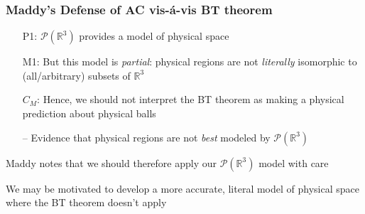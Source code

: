 \begin{frame}
\frametitle{Maddy's Defense of AC vis-\'a-vis BT theorem}

\begin{itemize}[<+->]


\item[P1:] $\mathcal{P}(\mathbb{R}^3)$ provides a model of physical space

\item[M1:] But this model is \textit{partial}: physical regions are not \textit{literally} isomorphic to (all/arbitrary) subsets of $\mathbb{R}^3$

\item[$C_M$:] Hence, we should not interpret the BT theorem as making a physical prediction about physical balls 

\item[] -- Evidence that physical regions are not \textit{best} modeled by $\mathcal{P}(\mathbb{R}^3)$


\end{itemize}

\pause 

Maddy notes that we should therefore apply our $\mathcal{P}(\mathbb{R}^3)$ model with care

\pause 
We may be motivated to develop a more accurate, literal model of physical space where the BT theorem doesn't apply

\end{frame}

